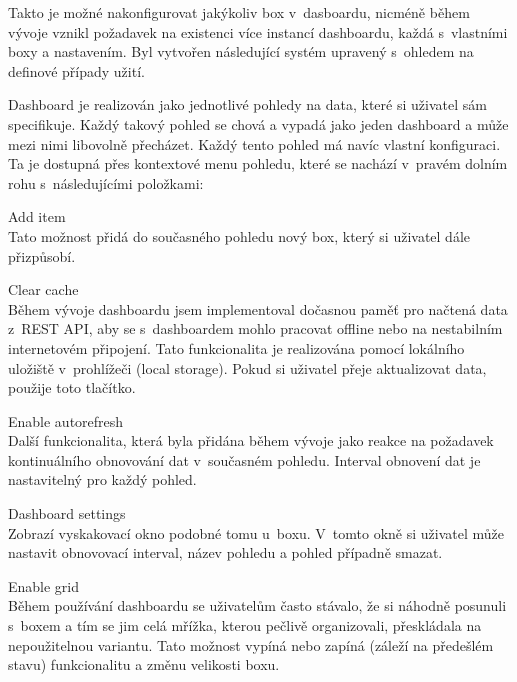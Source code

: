 Takto je možné nakonfigurovat jakýkoliv box v~dasboardu, nicméně během vývoje vznikl požadavek na existenci více instancí dashboardu, každá s~vlastními boxy a nastavením. Byl vytvořen následující systém upravený s~ohledem na definové případy užití.

Dashboard je realizován jako jednotlivé pohledy na data, které si uživatel sám specifikuje. Každý takový pohled se chová a vypadá jako jeden dashboard a může mezi nimi libovolně přecházet. Každý tento pohled má navíc vlastní konfiguraci. Ta je dostupná přes kontextové menu pohledu, které se nachází v~pravém dolním rohu s~následujícími položkami:

\begin{description}
    \item Add item \\
        Tato možnost přidá do současného pohledu nový box, který si uživatel dále přizpůsobí.

    \item Clear cache \\
        Během vývoje dashboardu jsem implementoval dočasnou paměť pro načtená data z~REST API, aby se s~dashboardem mohlo pracovat offline nebo na nestabilním internetovém připojení. Tato funkcionalita je realizována pomocí lokálního uložiště v~prohlížeči (local storage). Pokud si uživatel přeje aktualizovat data, použije toto tlačítko. 

    \item Enable autorefresh \\
        Další funkcionalita, která byla přidána během vývoje jako reakce na požadavek kontinuálního obnovování dat v~současném pohledu. Interval obnovení dat je nastavitelný pro každý pohled.

    \item Dashboard settings \\
        Zobrazí vyskakovací okno podobné tomu u~boxu. V~tomto okně si uživatel může nastavit obnovovací interval, název pohledu a pohled případně smazat.
        
    \item Enable grid\\
        Během používání dashboardu se uživatelům často stávalo, že si náhodně posunuli s~boxem a tím se jim celá mřížka, kterou pečlivě organizovali, přeskládala na nepoužitelnou variantu. Tato možnost vypíná nebo zapíná (záleží na předešlém stavu)  funkcionalitu a změnu velikosti boxu.
\end{description}

